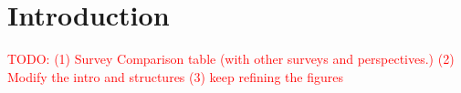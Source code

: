 \section{Introduction}
\label{sec:intro}
\textcolor{red}{TODO: (1) Survey Comparison table (with other surveys and perspectives.) (2) Modify the intro and structures (3) keep refining the figures





}
